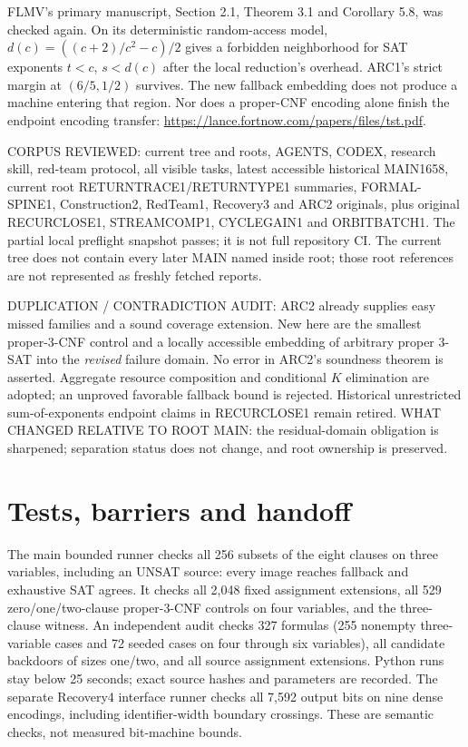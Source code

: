 \documentclass[11pt]{article}
\begin{document}
FLMV's primary manuscript, Section 2.1, Theorem 3.1 and Corollary 5.8,
was checked again. On its deterministic random-access model,
$d(c)=((c+2)/c^2-c)/2$ gives a forbidden neighborhood for SAT exponents
$t<c$, $s<d(c)$ after the local reduction's overhead. ARC1's strict
margin at $(6/5,1/2)$ survives. The new fallback embedding does not
produce a machine entering that region. Nor does a proper-CNF encoding
alone finish the endpoint encoding transfer:
\url{https://lance.fortnow.com/papers/files/tst.pdf}.

CORPUS REVIEWED: current tree and roots, AGENTS, CODEX, research skill,
red-team protocol, all visible tasks, latest accessible historical
MAIN1658, current root RETURNTRACE1/RETURNTYPE1 summaries,
FORMAL-SPINE1, Construction2, RedTeam1, Recovery3 and ARC2 originals,
plus original RECURCLOSE1, STREAMCOMP1, CYCLEGAIN1 and ORBITBATCH1.
The partial local preflight snapshot passes; it is not full repository CI.
The current tree does not contain every later MAIN named inside root;
those root references are not represented as freshly fetched reports.

DUPLICATION / CONTRADICTION AUDIT: ARC2 already supplies easy missed
families and a sound coverage extension. New here are the smallest
proper-3-CNF control and a locally accessible embedding of arbitrary
proper 3-SAT into the \emph{revised} failure domain. No error in ARC2's
soundness theorem is asserted. Aggregate resource composition and
conditional $K$ elimination are adopted; an unproved favorable fallback
bound is rejected. Historical unrestricted sum-of-exponents endpoint
claims in RECURCLOSE1 remain retired. WHAT CHANGED RELATIVE TO ROOT MAIN:
the residual-domain obligation is sharpened; separation status does not
change, and root ownership is preserved.

\section{Tests, barriers and handoff}
The main bounded runner checks all 256 subsets of the eight clauses on
three variables, including an UNSAT source: every image reaches fallback
and exhaustive SAT agrees. It checks all 2,048 fixed assignment
extensions, all 529 zero/one/two-clause proper-3-CNF controls on four
variables, and the three-clause witness. An independent audit checks
327 formulas (255 nonempty three-variable cases and 72 seeded cases on
four through six variables), all candidate backdoors of sizes one/two,
and all source assignment extensions. Python runs stay below 25 seconds;
exact source hashes and parameters are recorded. The separate Recovery4 interface runner checks all 7,592 output bits on nine dense encodings, including identifier-width boundary crossings. These are semantic
checks, not measured bit-machine bounds.
\end{document}
